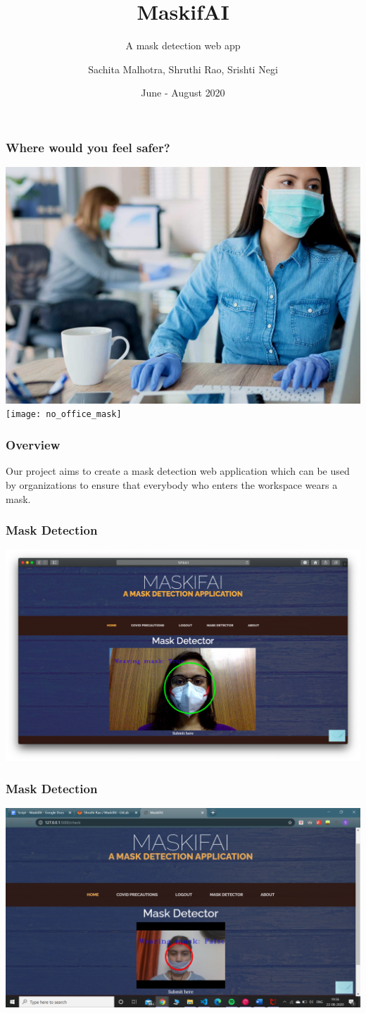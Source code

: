 \documentclass[14pt]{beamer}
\title{MaskifAI}
\subtitle{A mask detection web app}
\author[TEAM 6]{Sachita Malhotra, Shruthi Rao, Srishti Negi}
\date{June - August 2020}
\begin{document}
\begin{frame}
    \titlepage
\end{frame}

\begin{frame}
    \frametitle{Where would you feel safer?}
    \includegraphics[width=4.5 cm,height=3.5 cm]{office_mask}
    \texttt{[image: no\_office\_mask]}
\end{frame}

\begin{frame}
    \frametitle{Overview}
    Our project aims to create a mask detection web application which can be used by organizations to ensure that everybody who enters the workspace wears a mask.
\end{frame}

\begin{frame}
    \frametitle{Mask Detection}
    \includegraphics[scale=0.2]{mask_true}
\end{frame}

\begin{frame}
    \frametitle{Mask Detection}
    \includegraphics[scale=0.2]{improper_mask}
\end{frame}
\end{document}
